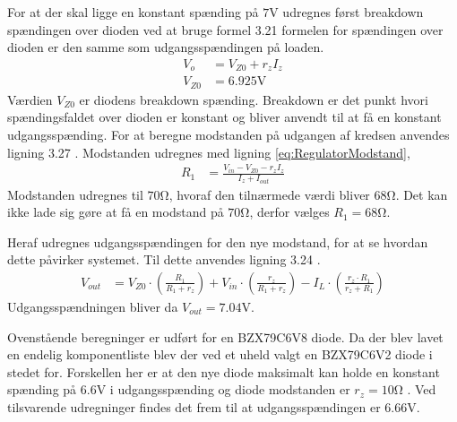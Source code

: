 For at der skal ligge en konstant spænding på $7 \si{\volt}$ udregnes først breakdown spændingen over dioden ved at bruge formel 3.21 \cite[Side. 146]{Sedra19uu} formelen for spændingen over dioden er den samme som udgangsspændingen på loaden. 
\begin{align}
	V_o & = V_{Z0} + r_z I_z \\
	V_{Z0} & = 6.925 \si{\volt}
	\end{align}
Værdien $V_{Z0}$ er diodens breakdown spænding.
Breakdown er det punkt hvori spændingsfaldet over dioden er konstant og bliver anvendt til at få en konstant udgangsspænding.
For at beregne modstanden på udgangen af kredsen anvendes ligning 3.27 \cite[Side. 149]{Sedra19uu}.
Modstanden udregnes med ligning \ref{eq:RegulatorModstand}, 
\begin{align}
	R_1 & = \frac{V_{in}-V_{Z0}-r_z I_z}{I_z+I_{out}} \label{eq:RegulatorModstand}
\end{align}
Modstanden udregnes til $70 \si{\ohm}$, hvoraf den tilnærmede værdi bliver $68 \si{\ohm}$.
Det kan ikke lade sig gøre at få en modstand på $70 \si{\ohm}$, derfor vælges $R_1 = 68 \si{\ohm}$.

Heraf udregnes udgangsspændingen for den nye modstand, for at se hvordan dette påvirker systemet.
Til dette anvendes ligning 3.24 \cite[Side. 149]{Sedra19uu}.
\begin{align}
	V_{out} & = V_{Z0} \cdot \left( \frac{R_1}{R_1+r_z} \right) + V_{in} \cdot \left( \frac{r_z}{R_1+r_z} \right) - I_L \cdot \left( \frac{r_z \cdot R_1}{r_z+R_1} \right)
\end{align}
Udgangsspændningen bliver da $V_{out} = 7.04 \si{\volt}$.

Ovenstående beregninger er udført for en BZX79C6V8 diode. 
Da der blev lavet en endelig komponentliste blev der ved et uheld valgt en BZX79C6V2 diode i stedet for. 
Forskellen her er at den nye diode maksimalt kan holde en konstant spænding på $6.6 \si{\volt}$ i udgangsspænding og diode modstanden er $r_z = 10 \si{\ohm}$ \cite[Side. 1 Kolonne 11]{ZenerDiode}.
Ved tilsvarende udregninger findes det frem til at udgangsspændingen er $6.66 \si{\volt}$.
